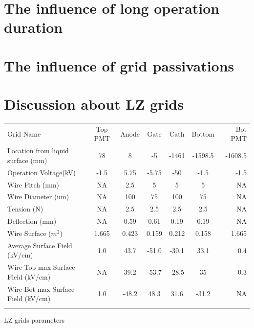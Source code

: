 \section{The influence of long operation duration}

\section{The influence of grid passivations}
















































\section{Discussion about LZ grids}


\begin{center} 
  \begin{tabular}{ | l | c  c  c c c  r |}
    \hline 
    Grid Name & Top PMT & Anode & Gate & Cath & Bottom & Bot PMT\\ 
	Location from liquid surface (mm) & 78 & 8 & -5 & -1461 & -1598.5 & -1608.5\\
    Operation Voltage(kV) & -1.5 & 5.75 & -5.75 & -50 & -1.5 & -1.5 \\
	Wire Pitch (mm)& NA & 2.5 & 5 & 5 & 5 & NA\\ 
	Wire Diameter (um) & NA & 100 & 75 & 100 & 75 & NA\\
    Tension (N) & NA & 2.5 & 2.5 & 2.5 & 2.5 & NA \\
    Deflection (mm) & NA & 0.59 & 0.61 & 0.19 & 0.19 & NA \\
    Wire Surface ($m^2$) & 1.665 & 0.423 & 0.159 & 0.212  & 0.158 & 1.665 \\
    Average Surface Field (kV/cm) & 1.0 & 43.7 & -51.0 & -30.1 & 33.1 & 0.4 \\
    Wire Top max Surface Field (kV/cm) & NA & 39.2 & -53.7 & -28.5 & 35 & 0.3 \\ 
	Wire Bot max Surface Field (kV/cm) & 1.0 & -48.2 & 48.3 & 31.6 & -31.2 & NA \\
 \\ 
  \end{tabular}
 LZ grids parameters
\end{center}





